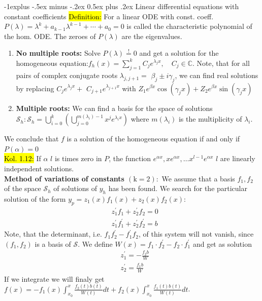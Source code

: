 \documentclass[10pt,landscape]{article}
\makeatletter
\newcommand{\green}[1]{\sethlcolor{green}\hl{#1}}
\newcommand{\blue}[1]{\sethlcolor{cyan} \hl{#1}}
\renewcommand{\subsection}{\@startsection{subsection}{2}{0mm}%
                                {-1explus -.5ex minus -.2ex}%
                                {0.5ex plus .2ex}%
                                {\normalfont\normalsize\bfseries}}
\makeatother
\begin{document}
\begin{multicols}{3}
\subsection{Linear differential equations with constant coefficients}
\blue{Definition:} For a linear ODE with const. coeff.$P(\lambda)=\lambda^{k}+a_{k-1} \lambda^{k-1}+\cdots+a_{0}=0$
is called the characteristic polynomial of the hom. ODE. The zeroes of $P(\lambda)$ are the eigenvalues.
\begin{enumerate}
        \item \textbf{No multiple roots:} Solve $P(\lambda) \stackrel{!}{=} 0$ and get a solution for the homogeneous equation:$
        f_{h}(x)=\sum_{j=1}^{k} C_{j} e^{\lambda_{j} x}, \quad C_{j} \in \mathbb{C}$.
        Note, that for all pairs of complex conjugate roots $\lambda_{j, j+1}=$ $\beta_{j} \pm i \gamma_{j}$, 
        we can find real solutions by replacing $C_{j} e^{\lambda_{j} x}+$ $C_{j+1} e^{\lambda_{j+1} x}$ with $Z_{1} e^{\beta x} \cos \left(\gamma_{j} x\right)+Z_{2} e^{\beta x} \sin \left(\gamma_{j} x\right)$
        \item \textbf{Multiple roots:} We can find a basis for the space of solutions $\mathcal{S}_{h}: \mathcal{S}_{h}=\bigcup_{i=0}^{k}\left(\bigcup_{j=0}^{m\left(\lambda_{i}\right)-1} x^{j} e^{\lambda_{i} x}\right)$
        where $m\left(\lambda_{i}\right)$ is the multiplicity of $\lambda_{i}$.
\end{enumerate} 
We conclude that $f$ is a solution of the homogeneous equation if and only if $P(\alpha)=0$\\
\green{Kol. 1.12:} If $\alpha$ $l$ is times zero in $P$, the function $e^{\alpha x}, 
xe^{\alpha x}, \dots x^{l -  1}e^{\alpha x}$ $l$ are linearly independent solutions.\\
\textbf{Method of variations of constants $(\mathrm{k}=2):$} We assume that a basis $f_{1}, f_{2}$ of the space $\mathcal{S}_{h}$ 
of solutions of $y_{h}$ has been found. We search for the particular solution of the form $y_{p}=z_{1}(x) f_{1}(x)+z_{2}(x) f_{2}(x):$
$$
\begin{aligned}
        &z_{1}^{\prime} f_{1}+z_{2}^{\prime} f_{2}=0 \\
        &z_{1}^{\prime} f_{1}^{\prime}+z_{2}^{\prime} f_{2}^{\prime}=b
\end{aligned}    
$$
Note, that the determinant, i.e. $f_{1} f_{2}^{\prime}-f_{1}^{\prime} f_{2}$, 
of this system will not vanish, since $\left(f_{1}, f_{2}\right)$ is a basis of $\mathcal{S}$. 
We define $W(x) = f_{1} \cdot f_{2}^{\prime} - f_{2} \cdot f_{1}^{\prime}$ and get as solution 
$$
\begin{aligned}
        &z_{1}^{\prime} = -\frac{f_2 b}{W} \\
        &z_{2}^{\prime} = \frac{f_1 b}{W}
\end{aligned}    
$$
If we integrate we will finaly get $f(x)= -f_1(x) \int_{x_0}^{x} \frac{f_2(t) b(t)}{W(t)} d t+f_2(x) \int_{x_0}^{x} \frac{f_1(t) b(t)}{W(t)} d t$.

\end{multicols}
\end{document}
